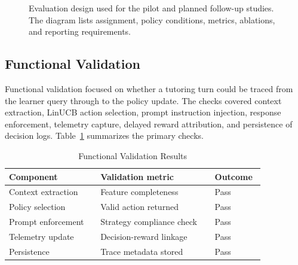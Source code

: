 \documentclass[conference]{IEEEtran}
\begin{document}
\begin{figure}[htbp]
\centering
{}
\caption{Evaluation design used for the pilot and planned follow-up studies. The diagram lists assignment, policy conditions, metrics, ablations, and reporting requirements.}
\label{fig:evaluation-design}
\end{figure}
\FloatBarrier

\subsection{Functional Validation}

Functional validation focused on whether a tutoring turn could be traced from the learner query through to the policy update. The checks covered context extraction, LinUCB action selection, prompt instruction injection, response enforcement, telemetry capture, delayed reward attribution, and persistence of decision logs. Table~\ref{tab:functional-tests} summarizes the primary checks.

\begin{table}[htbp]
\caption{Functional Validation Results}
\label{tab:functional-tests}
\centering
\scriptsize
\begin{tabular}{p{0.32\linewidth}p{0.40\linewidth}p{0.13\linewidth}}
\toprule
\textbf{Component} & \textbf{Validation metric} & \textbf{Outcome} \\
\midrule
Context extraction & Feature completeness & Pass \\
Policy selection & Valid action returned & Pass \\
Prompt enforcement & Strategy compliance check & Pass \\
Telemetry update & Decision-reward linkage & Pass \\
Persistence & Trace metadata stored & Pass \\
\bottomrule
\end{tabular}
\end{table}
\end{document}
